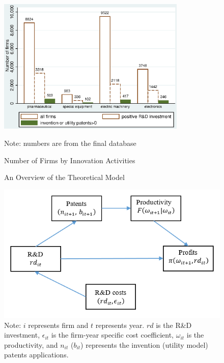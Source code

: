 \documentclass[english]{article}
\begin{document}
\begin{center}
\begin{figure}[H]
\label{F1}
\caption{Number of Firms by Innovation Activities} 

\begin{centering}
\includegraphics[width=0.8\textwidth]{FirmsCount.eps}
\par\end{centering}
{\small{}Note: numbers are from the final database}{\small \par}
\end{figure}
\par\end{center}

\begin{center}
\begin{figure}[H]
\caption{An Overview of the Theoretical Model}
\label{F2}

\begin{centering}
\includegraphics[width=1\textwidth]{Overview.PNG}
\par\end{centering}
\caption*{\small{}Note: $i$ represents firm and $t$ represents year. $rd$ is the R\&D investment, $\epsilon_{it}$ is the firm-year specific cost coefficient, $\omega_{it}$ is the productivity, and $n_{it}$ ($b_{it}$) represents the invention (utility model) patents applications.}{\small \par}
\end{figure}
\par\end{center}
\end{document}
